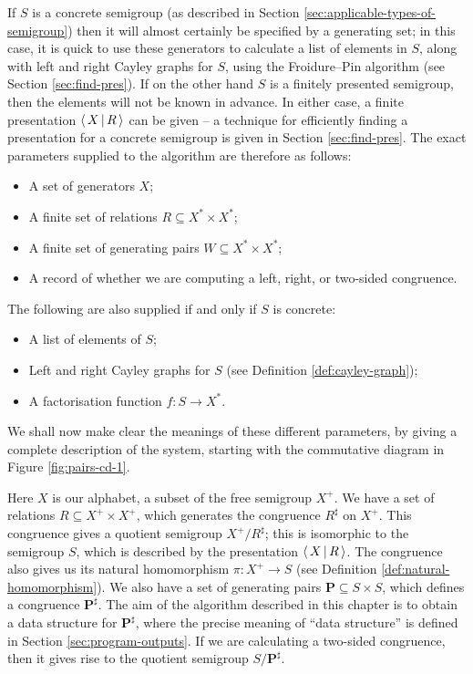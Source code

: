 If $S$ is a concrete semigroup (as described in Section
\ref{sec:applicable-types-of-semigroup}) then it will almost certainly be
specified by a generating set; in this case, it is quick to use these generators
to calculate a list of elements in $S$, along with left and right Cayley graphs
for $S$, using the Froidure--Pin algorithm (see Section \ref{sec:find-pres}).  If on the
other hand $S$ is a finitely presented semigroup, then the elements will not be
known in advance.  In either case, a finite presentation $\left\langle\,X\,\middle|\,R\,\right\rangle$ can be
given -- a technique for efficiently finding a presentation for a concrete
semigroup is given in Section \ref{sec:find-pres}.
The exact parameters supplied to the algorithm are therefore as follows:
\begin{itemize}
\item A set of generators $X$;
\item A finite set of relations $R \subseteq X^* \times X^*$;
\item A finite set of generating pairs $W \subseteq X^* \times X^*$;
\item A record of whether we are computing a left, right, or two-sided
  congruence.
\end{itemize}
The following are also supplied if and only if $S$ is concrete:
\begin{itemize}
\item A list of elements of $S$;
\item Left and right Cayley graphs for $S$ (see Definition
  \ref{def:cayley-graph});
\item A factorisation function $f : S \to X^*$.
\end{itemize}

We shall now make clear the meanings of these different parameters, by giving a
complete description of the system, starting with the commutative diagram in
Figure \ref{fig:pairs-cd-1}.

Here $X$ is our alphabet, a subset of the free semigroup $X^+$.  We have a set
of relations $R \subseteq X^+ \times X^+$, which generates the congruence
$R^\sharp$ on $X^+$.  This congruence gives a quotient semigroup
$X^+ / R^\sharp$; this is isomorphic to the semigroup $S$,
which is described by the presentation $\left\langle\,X\,\middle|\,R\,\right\rangle$.  The
congruence also gives us its natural homomorphism $\pi: X^+ \to S$ (see
Definition \ref{def:natural-homomorphism}).  We also have a set of generating pairs
$\mathbf{P} \subseteq S \times S$, which defines a congruence
$\mathbf{P}^\sharp$.  The aim of the algorithm described in this chapter is to
obtain a data structure for $\mathbf{P}^\sharp$, where the precise meaning of
``data structure'' is defined in Section \ref{sec:program-outputs}.  If we are
calculating a two-sided congruence, then it gives rise to the
quotient semigroup $S / \mathbf{P}^\sharp$.

